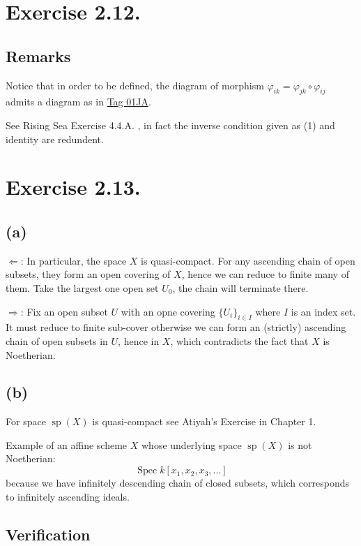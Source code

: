 \section{Exercise 2.12.}

\subsection{Remarks}

Notice that in order to be defined, the diagram of morphism $\varphi_{ik}=\varphi_{jk}\circ\varphi_{ij}$ admits a diagram as in \href{https://stacks.math.columbia.edu/tag/01JA}{Tag 01JA}.

See Rising Sea Exercise 4.4.A. , in fact the inverse condition given as (1) and identity are redundent.

\section{Exercise 2.13.}\label{Hart Chap 2 Ex 2.13.}

\subsection{(a)}

$\Leftarrow$: In particular, the space $X$ is quasi-compact. For any ascending chain of open subsets, they form an open covering of $X$, hence we can reduce to finite many of them. Take the largest one open set $U_0$, the chain will terminate there. 

$\Rightarrow$: Fix an open subset $U$ with an opne covering $\{U_i\}_{i\in I}$ where $I$ is an index set. It must reduce to finite sub-cover otherwise we can form an (strictly) ascending chain of open subsets in $U$, hence in $X$, which contradicts the fact that $X$ is Noetherian. 

\subsection{(b)}

For space $\operatorname{sp}(X)$ is quasi-compact see Atiyah's Exercise in Chapter 1. 

Example of an affine scheme $X$ whose underlying space $\operatorname{sp}(X)$ is not Noetherian: 
\[\operatorname{Spec}k[x_1,x_2,x_3,...]\] because we have infinitely descending chain of closed subsets, which corresponds to infinitely ascending ideals. 


\subsection{Verification}

